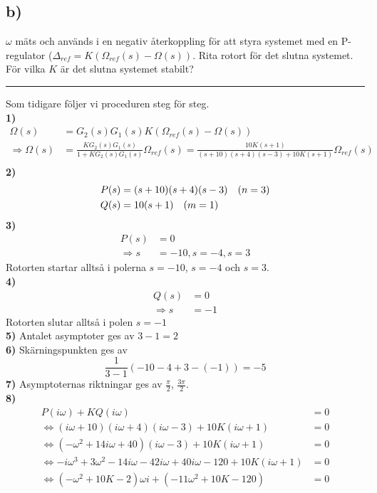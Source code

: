 \documentclass[12pt]{article}
\newcommand{\qline}{\hrule \vspace*{10pt}}
\begin{document}
\subsection*{b)}
$\omega$ mäts och används i en negativ återkoppling för att styra systemet med en P-regulator ($\Delta_{ref} = K(\Omega_{ref}(s) - \Omega(s))$. Rita rotort för det slutna systemet. För vilka $K$ är det slutna systemet stabilt?
\qline
Som tidigare följer vi proceduren steg för steg. \\
\textbf{1)}
\begin{align*}
  \Omega (s) &= G_2(s)G_1(s)K(\Omega_{ref}(s) - \Omega(s)) \\
  \Rightarrow \Omega(s) &= \frac{KG_2(s)G_1(s)}{1 + KG_2(s)G_1(s)}\Omega_{ref}(s) = \frac{10K(s+1)}{(s+10)(s+4)(s-3) + 10K(s+1)}\Omega_{ref}(s) \\
\end{align*}
\textbf{2)}
\begin{align*}
  P(s) &= (s+10)(s+4)(s-3) \hspace*{10pt} (n = 3) \\
  Q(s) &= 10(s+1) \hspace*{10pt} (m = 1)
\end{align*}
\textbf{3)}
\begin{align*}
  P(s) &= 0 \\
  \Rightarrow s &= -10, s = -4, s = 3
\end{align*}
Rotorten startar alltså i polerna $s = -10$, $s = -4$ och $s = 3$. \\
\textbf{4)}
\begin{align*}
  Q(s) &= 0 \\
  \Rightarrow s &= -1
\end{align*}
Rotorten slutar alltså i polen $s = -1$ \\
\textbf{5)} Antalet asymptoter ges av $3 - 1 = 2$ \\
\textbf{6)} Skärningspunkten ges av
\[\frac{1}{3-1}(-10-4+3 - (-1)) = -5\]
\textbf{7)} Asymptoternas riktningar ges av $\frac{\pi}{2}$, $\frac{3\pi}{2}$. \\
\textbf{8)} 
\begin{align*}
  P(i\omega) + KQ(i\omega) &= 0 \\
  \Leftrightarrow (i\omega+10)(i\omega+4)(i\omega-3) + 10K(i\omega+1) &= 0 \\
  \Leftrightarrow (-\omega^2+14i\omega+40)(i\omega-3) + 10K(i\omega+1) &= 0 \\
  \Leftrightarrow -i\omega^3+3\omega^2-14i\omega-42i\omega + 40i\omega-120 + 10K(i\omega+1) &= 0 \\
  \Leftrightarrow (-\omega^2 + 10K - 2)\omega i + (-11\omega^2 + 10K - 120) &= 0
\end{align*}
\end{document}
